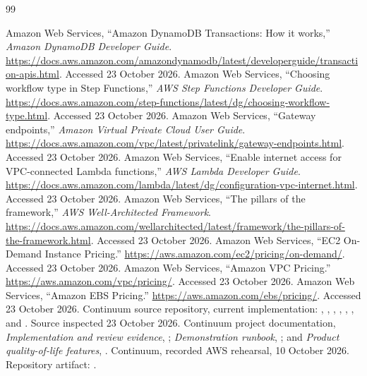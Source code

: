 \begingroup\fontsize{10}{11.5}\selectfont{}\setlength{\parskip}{0pt}
\begin{thebibliography}{99}
\fontsize{10}{11.5}\selectfont\setlength{\parskip}{0pt}\setlength{\itemsep}{4pt}
 Amazon Web Services, ``Amazon DynamoDB Transactions: How it works,'' \emph{Amazon DynamoDB Developer Guide}. \url{https://docs.aws.amazon.com/amazondynamodb/latest/developerguide/transaction-apis.html}. Accessed 23 October 2026.
 Amazon Web Services, ``Choosing workflow type in Step Functions,'' \emph{AWS Step Functions Developer Guide}. \url{https://docs.aws.amazon.com/step-functions/latest/dg/choosing-workflow-type.html}. Accessed 23 October 2026.
 Amazon Web Services, ``Gateway endpoints,'' \emph{Amazon Virtual Private Cloud User Guide}. \url{https://docs.aws.amazon.com/vpc/latest/privatelink/gateway-endpoints.html}. Accessed 23 October 2026.
 Amazon Web Services, ``Enable internet access for VPC-connected Lambda functions,'' \emph{AWS Lambda Developer Guide}. \url{https://docs.aws.amazon.com/lambda/latest/dg/configuration-vpc-internet.html}. Accessed 23 October 2026.
 Amazon Web Services, ``The pillars of the framework,'' \emph{AWS Well-Architected Framework}. \url{https://docs.aws.amazon.com/wellarchitected/latest/framework/the-pillars-of-the-framework.html}. Accessed 23 October 2026.
 Amazon Web Services, ``EC2 On-Demand Instance Pricing.'' \url{https://aws.amazon.com/ec2/pricing/on-demand/}. Accessed 23 October 2026.
 Amazon Web Services, ``Amazon VPC Pricing.'' \url{https://aws.amazon.com/vpc/pricing/}. Accessed 23 October 2026.
 Amazon Web Services, ``Amazon EBS Pricing.'' \url{https://aws.amazon.com/ebs/pricing/}. Accessed 23 October 2026.
 Continuum source repository, current implementation: , , , , , , and . Source inspected 23 October 2026.
 Continuum project documentation, \emph{Implementation and review evidence}, ; \emph{Demonstration runbook}, ; and \emph{Product quality-of-life features}, .
 Continuum, recorded AWS rehearsal, 10 October 2026. Repository artifact: .

\end{thebibliography}
